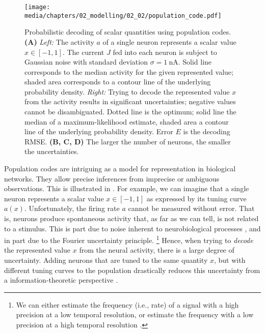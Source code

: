 \begin{figure}
	\centering
	\texttt{[image: media/chapters/02\_modelling/02\_02/population\_code.pdf]}
	\caption[Probabilistic decoding of scalar quantities using population codes]{Probabilistic decoding of scalar quantities using population codes.
	\textbf{(A)} \emph{Left:} The activity $a$ of a single neuron represents a scalar value $x \in [-1, 1]$.
	The current $J$ fed into each neuron is subject to Gaussian noise with standard deviation $\sigma = \SI{1}{\nano\ampere}$.
	Solid line corresponds to the median activity for the given represented value; shaded area corresponds to a contour line of the underlying probability density.
	\emph{Right:} Trying to decode the represented value $x$ from the activity results in significant uncertainties; negative values cannot be disambiguated. Dotted line is the optimum; solid line the median of a maximum-likelihood estimate, shaded area a contour line of the underlying probability density.
	Error $E$ is the decoding RMSE.
	\textbf{(B, C, D)} The larger the number of neurons, the smaller the uncertainties.}
	\label{fig:population_code}
\end{figure}

Population codes are intriguing as a model for representation in biological networks.
They allow precise inferences from imprecise or ambiguous observations. This is illustrated in .
For example, we can imagine that a single neuron represents a scalar value $x \in [-1, 1]$ as expressed by its tuning curve $a(x)$.
Unfortunately, the firing rate $a$ cannot be measured without error.
That is, neurons produce spontaneous activity that, as far as we can tell, is not related to a stimulus.
This is part due to noise inherent to neurobiological processes \citep[cf.][Section~2.2.1]{eliasmith2003neural}, and in part due to the Fourier uncertainty principle.%
\footnote{We can either estimate the frequency (i.e., rate) of a signal with a high precision at a low temporal resolution, or estimate the frequency with a low precision at a high temporal resolution \citep{gabor1946theory}.}
Hence, when trying to \emph{decode} the represented value $x$ from the neural activity, there is a large degree of uncertainty.
Adding neurons that are tuned to the same quantity $x$, but with different tuning curves to the population drastically reduces this uncertainty from a information-theoretic perspective \citep{ma2009population}.
